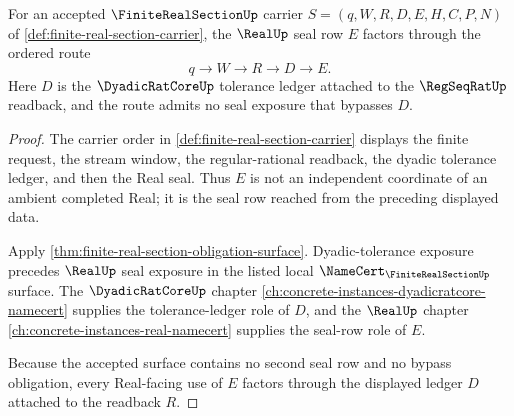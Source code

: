 \begin{theorem}
\label{thm:finite-real-section-dyadic-seal-factorization}
For an accepted $\FiniteRealSectionUp$ carrier $S=(q,W,R,D,E,H,C,P,N)$ of \autoref{def:finite-real-section-carrier}, the $\RealUp$ seal row $E$ factors through the ordered route
$$
q \to W \to R \to D \to E.
$$
Here $D$ is the $\DyadicRatCoreUp$ tolerance ledger attached to the $\RegSeqRatUp$ readback, and the route admits no seal exposure that bypasses $D$.
\end{theorem}
\begin{proof}
The carrier order in \autoref{def:finite-real-section-carrier} displays the finite request, the stream window, the regular-rational readback, the dyadic tolerance ledger, and then the Real seal. Thus $E$ is not an independent coordinate of an ambient completed Real; it is the seal row reached from the preceding displayed data.

Apply \autoref{thm:finite-real-section-obligation-surface}. Dyadic-tolerance exposure precedes $\RealUp$ seal exposure in the listed local $\NameCert_{\FiniteRealSectionUp}$ surface. The $\DyadicRatCoreUp$ chapter \autoref{ch:concrete-instances-dyadicratcore-namecert} supplies the tolerance-ledger role of $D$, and the $\RealUp$ chapter \autoref{ch:concrete-instances-real-namecert} supplies the seal-row role of $E$.

Because the accepted surface contains no second seal row and no bypass obligation, every Real-facing use of $E$ factors through the displayed ledger $D$ attached to the readback $R$.
\end{proof}

